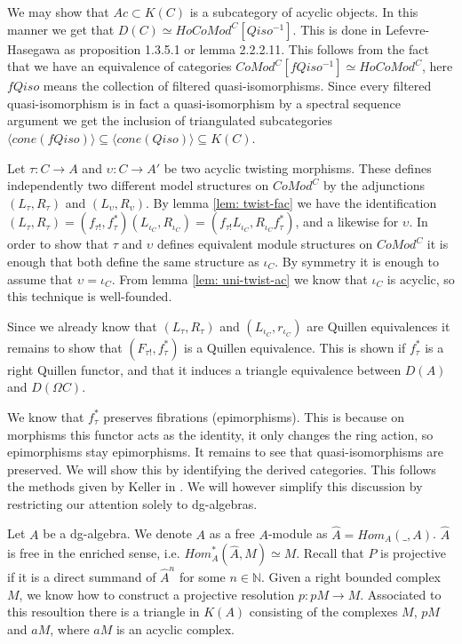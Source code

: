 \documentclass[../thesis.tex]{subfiles}
\begin{document}
            \begin{remark}
                We may show that $Ac\subset K(C)$ is a subcategory of acyclic objects. In this manner we get that $D(C) \simeq HoCoMod^C[Qiso^{-1}]$. This is done in Lefevre-Hasegawa \cite{LefevreHasegawa03} as proposition 1.3.5.1 or lemma 2.2.2.11. This follows from the fact that we have an equivalence of categories $CoMod^C[fQiso^{-1}]\simeq HoCoMod^C$, here $fQiso$ means the collection of filtered quasi-isomorphisms. Since every filtered quasi-isomorphism is in fact a quasi-isomorphism by a spectral sequence argument we get the inclusion of triangulated subcategories $\langle cone(fQiso)\rangle \subseteq \langle cone(Qiso)\rangle \subseteq K(C)$.
            \end{remark}

            Let $\tau: C \rightarrow A$ and $\upsilon : C \rightarrow A'$ be two acyclic twisting morphisms. These defines independently two different model structures on $CoMod^C$ by the adjunctions $(L_\tau, R_\tau)$ and $(L_\upsilon, R_\upsilon)$. By lemma \ref{lem: twist-fac} we have the identification $(L_\tau, R_\tau) = (f_{\tau !},f_\tau^*)(L_{\iota_C},R_{\iota_C}) = (f_{\tau !}L_{\iota_C},R_{\iota_C}f_\tau^*)$, and a likewise for $\upsilon$. In order to show that $\tau$ and $\upsilon$ defines equivalent module structures on $CoMod^C$ it is enough that both define the same structure as $\iota_C$. By symmetry it is enough to assume that $\upsilon = \iota_C$. From lemma \ref{lem: uni-twist-ac} we know that $\iota_C$ is acyclic, so this technique is well-founded.

            Since we already know that $(L_\tau, R_\tau)$ and $(L_{\iota_C}, r_{\iota_C})$ are Quillen equivalences it remains to show that $(F_{\tau !},f_\tau^*)$ is a Quillen equivalence. This is shown if $f_\tau^*$ is a right Quillen functor, and that it induces a triangle equivalence between $D(A)$ and $D(\Omega C)$.

            We know that $f_\tau^*$ preserves fibrations (epimorphisms). This is because on morphisms this functor acts as the identity, it only changes the ring action, so epimorphisms stay epimorphisms. It remains to see that quasi-isomorphisms are preserved. We will show this by identifying the derived categories. This follows the methods given by Keller in \cite{Keller94}. We will however simplify this discussion by restricting our attention solely to dg-algebras.

            Let $A$ be a dg-algebra. We denote $A$ as a free $A$-module as $\hat{A} = Hom_A(\_,A)$. $\hat{A}$ is free in the enriched sense, i.e. ${Hom}^*_A(\hat{A},M) \simeq M$.  Recall that $P$ is projective if it is a direct summand of $\hat{A}^n$ for some $n\in \mathbb{N}$. Given a right bounded complex $M$, we know how to construct a projective resolution $p: pM \rightarrow M$. Associated to this resoultion there is a triangle in $K(A)$ consisting of the complexes $M$, $pM$ and $aM$, where $aM$ is an acyclic complex.
\end{document}
